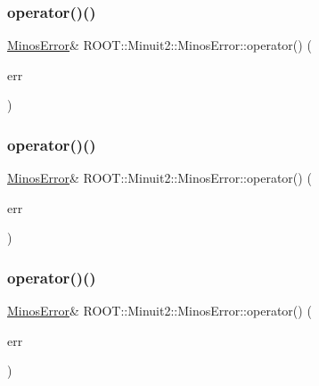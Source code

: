 \subsubsection{\texorpdfstring{operator()()}{operator()()}\hspace{0.1cm}{\footnotesize\ttfamily [1/6]}}
{\footnotesize\ttfamily \mbox{\hyperlink{classROOT_1_1Minuit2_1_1MinosError}{Minos\+Error}}\& R\+O\+O\+T\+::\+Minuit2\+::\+Minos\+Error\+::operator() (\begin{DoxyParamCaption}\item[{const \mbox{\hyperlink{classROOT_1_1Minuit2_1_1MinosError}{Minos\+Error}} \&}]{err }\end{DoxyParamCaption})\hspace{0.3cm}{\ttfamily [inline]}}

\mbox{\label{classROOT_1_1Minuit2_1_1MinosError_ac45b7f3397fe4c13e1811b486e10602a}} 
\subsubsection{\texorpdfstring{operator()()}{operator()()}\hspace{0.1cm}{\footnotesize\ttfamily [2/6]}}
{\footnotesize\ttfamily \mbox{\hyperlink{classROOT_1_1Minuit2_1_1MinosError}{Minos\+Error}}\& R\+O\+O\+T\+::\+Minuit2\+::\+Minos\+Error\+::operator() (\begin{DoxyParamCaption}\item[{const \mbox{\hyperlink{classROOT_1_1Minuit2_1_1MinosError}{Minos\+Error}} \&}]{err }\end{DoxyParamCaption})\hspace{0.3cm}{\ttfamily [inline]}}

\mbox{\label{classROOT_1_1Minuit2_1_1MinosError_ac45b7f3397fe4c13e1811b486e10602a}} 
\subsubsection{\texorpdfstring{operator()()}{operator()()}\hspace{0.1cm}{\footnotesize\ttfamily [3/6]}}
{\footnotesize\ttfamily \mbox{\hyperlink{classROOT_1_1Minuit2_1_1MinosError}{Minos\+Error}}\& R\+O\+O\+T\+::\+Minuit2\+::\+Minos\+Error\+::operator() (\begin{DoxyParamCaption}\item[{const \mbox{\hyperlink{classROOT_1_1Minuit2_1_1MinosError}{Minos\+Error}} \&}]{err }\end{DoxyParamCaption})\hspace{0.3cm}{\ttfamily [inline]}}

